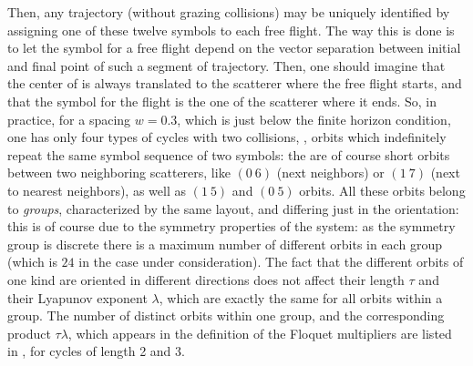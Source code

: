 {Then, any trajectory (without grazing collisions) may be uniquely
identified by assigning one of these twelve symbols to each free
flight. The way this is done is to let the symbol for a free flight
depend on the vector separation between initial and final point of
such a segment of trajectory. Then, one should imagine that the
center of
  is always translated to the scatterer
where the free flight starts,
and that the symbol for the flight is the one of the scatterer
where it ends. So, in practice, for a spacing $w=0.3$, which
is just below the finite horizon condition, one has only four types
of cycles with two collisions, \ie, orbits which indefinitely
repeat the same symbol sequence of two symbols:
the are of course short orbits between two neighboring scatterers,
like $(0~6)$ (next neighbors) or $(1~7)$ (next to nearest
neighbors), as well as $(1~5)$ and $(0~5)$ orbits. All these
orbits belong to {\em groups}, characterized by the same layout,
and differing just in the orientation: this is of course due to
the symmetry properties of the system: as the symmetry group is
discrete there is a maximum number of different orbits in each group
(which is $24$ in the case under consideration).
The fact that the different orbits of one kind
are oriented in different directions does not affect their
length $\tau$ and their Lyapunov exponent $\lambda$,
which are exactly the same
for all orbits within a group.
The number of distinct orbits within one
group, and the corresponding product $\tau \lambda$, which
appears in the definition of the Floquet multipliers are
listed in , for cycles of length 2 and 3.
%
%
}
